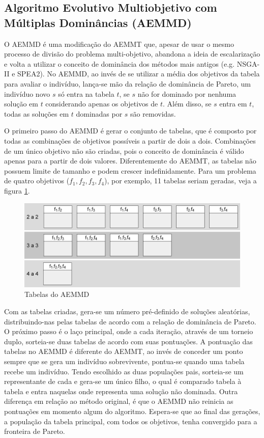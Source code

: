 \subsection{Algoritmo Evolutivo Multiobjetivo com Múltiplas Dominâncias (AEMMD)}

O AEMMD é uma modificação do AEMMT que, apesar de usar o mesmo processo de divisão do problema multi-objetivo, abandona a ideia de escalarização e volta a utilizar o conceito de dominância dos métodos mais antigos (e.g. NSGA-II e SPEA2). No AEMMD, ao invés de se utilizar a média dos objetivos da tabela para avaliar o indivíduo, lança-se mão da relação de dominância de Pareto, um indivíduo novo $s$ só entra na tabela $t$, se $s$ não for dominado por nenhuma solução em $t$ considerando apenas os objetivos de $t$. Além disso, se $s$ entra em $t$, todas as soluções em $t$ dominadas por $s$ são removidas.

O primeiro passo do AEMMD é gerar o conjunto de tabelas, que é composto por todas as combinações de objetivos possíveis a partir de dois a dois. Combinações de um único objetivo não são criadas, pois o conceito de dominância é válido apenas para a partir de dois valores. Diferentemente do AEMMT, as tabelas não possuem limite de tamanho e podem crescer indefinidamente. Para um problema de quatro objetivos ($f_1, f_2, f_3, f_4$), por exemplo, 11 tabelas seriam geradas, veja a figura \ref{fig_aemmd_tabelas}.

\begin{figure}
	\label{fig_aemmd_tabelas}
	\caption{Tabelas do AEMMD}
	\centering
	\includegraphics[width=1\textwidth]{cap_otimizacao-multi/figs/aeemd-tabelas}
\end{figure}

Com as tabelas criadas, gera-se um número pré-definido de soluções aleatórias, distribuindo-nas pelas tabelas de acordo com a relação de dominância de Pareto. O próximo passo é o laço principal, onde a cada iteração, através de um torneio duplo, sorteia-se duas tabelas de acordo com suas pontuações. A pontuação das tabelas no AEMMD é diferente do AEMMT, ao invés de conceder um ponto sempre que se gera um indivíduo sobrevivente, pontua-se quando uma tabela recebe um indivíduo. Tendo escolhido as duas populações pais, sorteia-se um representante de cada e gera-se um único filho, o qual é comparado tabela à tabela e entra naquelas onde representa uma solução não dominada. Outra diferença em relação ao método original, é que o AEMMD não reinicia as pontuações em momento algum do algoritmo. Espera-se que ao final das gerações, a população da tabela principal, com todos os objetivos, tenha convergido para a fronteira de Pareto. 


